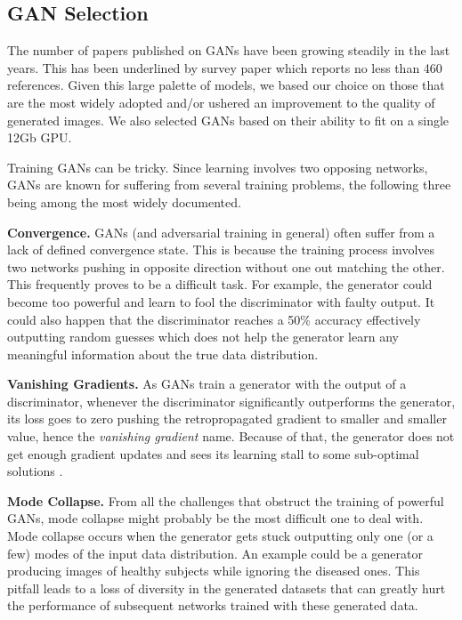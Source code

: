 \documentclass[preprint,12pt, authoryear]{elsarticle}
\begin{document}
\subsection{GAN Selection}
The number of papers published on GANs have been growing steadily in the last years.  This has been underlined by \cite{Gonog2019ARG} survey paper which reports no less than 460 references.  Given this large palette of models, we based our choice on those that are the most widely adopted and/or ushered an improvement to the quality of generated images.  We also selected GANs based on their ability to fit on a single 12Gb GPU.

Training GANs can be tricky. Since learning involves two opposing networks, GANs are known for suffering from several training problems, the following three being among the most widely documented.

\textbf{Convergence.}  GANs (and adversarial training in general) often suffer from a lack of defined convergence state.  This is because the training process involves two networks pushing in opposite direction without one out matching the other. This frequently proves to be a difficult task. For example, the generator could become too powerful and learn to fool the discriminator with faulty output.  It could also happen that the discriminator reaches a 50\% accuracy effectively outputting random guesses which does not help the generator learn any meaningful information about the true data distribution.


\textbf{Vanishing Gradients.}  As GANs train a generator with the output of a discriminator, whenever the discriminator significantly outperforms the generator, its loss goes to zero pushing the retropropagated gradient to smaller and smaller value, hence the {\em vanishing gradient} name.  Because of that, the generator does not get enough gradient updates and sees its learning stall to some sub-optimal solutions \citep{Arjovsky2017TowardsPM}.


\textbf{Mode Collapse.}  From all the challenges that obstruct the training of powerful GANs, mode collapse might probably be the most difficult one to deal with.  Mode collapse occurs when the generator gets stuck outputting only one (or a few) modes of the input data distribution. An example could be a generator producing images of  healthy subjects while ignoring the diseased ones. This pitfall leads to a loss of diversity in the generated datasets that can greatly hurt the performance of subsequent networks trained with these generated data.
\end{document}
